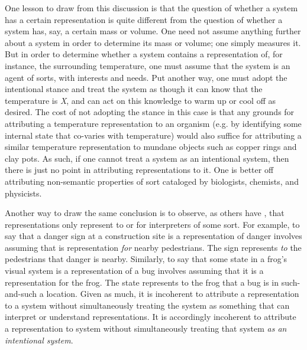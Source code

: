 One lesson to draw from this discussion is that the question of whether a system has a certain representation is quite different from the question of whether a system has, say, a certain mass or volume. One need not assume anything further about a system in order to determine its mass or volume; one simply measures it. But in order to determine whether a system contains a representation of, for instance, the surrounding temperature, one must assume that the system is an agent of sorts, with interests and needs. Put another way, one must adopt the intentional stance and treat the system as though it can know that the temperature is \textit{X}, and can act on this knowledge to warm up or cool off as desired. The cost of not adopting the stance in this case is that any grounds for attributing a temperature representation to an organism (e.g. by identifying some internal state that co-varies with temperature) would also suffice for attributing a similar temperature representation to mundane objects such as copper rings and clay pots. As such, if one cannot treat a system as an intentional system, then there is just no point in attributing representations to it. One is better off attributing non-semantic properties of sort cataloged by biologists, chemists, and physicists.  

Another way to draw the same conclusion is to observe, as others have \citep[e.g.][]{Brandom:1994}, that representations only represent to or for interpreters of some sort. For example, to say that a danger sign at a construction site is a representation of danger involves assuming that is representation \textit{for} nearby pedestrians. The sign represents \textit{to} the pedestrians that danger is nearby. Similarly, to say that some state in a frog's visual system is a representation of a bug involves assuming that it is a representation for the frog. The state represents to the frog that a bug is in such-and-such a location. Given as much, it is incoherent to attribute a representation to a system without simultaneously treating the system as something that can interpret or understand representations. It is accordingly incoherent to attribute a representation to system without simultaneously treating that system \textit{as an intentional system}. 

